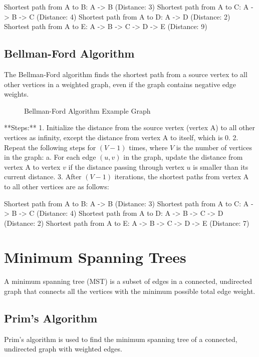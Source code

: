 \documentclass{article}
\begin{document}
Shortest path from A to B: A -> B (Distance: 3)
Shortest path from A to C: A -> B -> C (Distance: 4)
Shortest path from A to D: A -> D (Distance: 2)
Shortest path from A to E: A -> B -> C -> D -> E (Distance: 9)

\subsection{Bellman-Ford Algorithm}
The Bellman-Ford algorithm finds the shortest path from a source vertex to all other vertices in a weighted graph, even if the graph contains negative edge weights.

\begin{figure}[h]
    \centering
    \caption{Bellman-Ford Algorithm Example Graph}
\end{figure}

**Steps:**
1. Initialize the distance from the source vertex (vertex A) to all other vertices as infinity, except the distance from vertex A to itself, which is 0.
2. Repeat the following steps for $(V-1)$ times, where $V$ is the number of vertices in the graph:
   a. For each edge $(u, v)$ in the graph, update the distance from vertex A to vertex $v$ if the distance passing through vertex $u$ is smaller than its current distance.
3. After $(V-1)$ iterations, the shortest paths from vertex A to all other vertices are as follows:

Shortest path from A to B: A -> B (Distance: 3)
Shortest path from A to C: A -> B -> C (Distance: 4)
Shortest path from A to D: A -> B -> C -> D (Distance: 2)
Shortest path from A to E: A -> B -> C -> D -> E (Distance: 7)

\section{Minimum Spanning Trees}
A minimum spanning tree (MST) is a subset of edges in a connected, undirected graph that connects all the vertices with the minimum possible total edge weight.

\subsection{Prim's Algorithm}
Prim's algorithm is used to find the minimum spanning tree of a connected, undirected graph with weighted edges.
\end{document}
